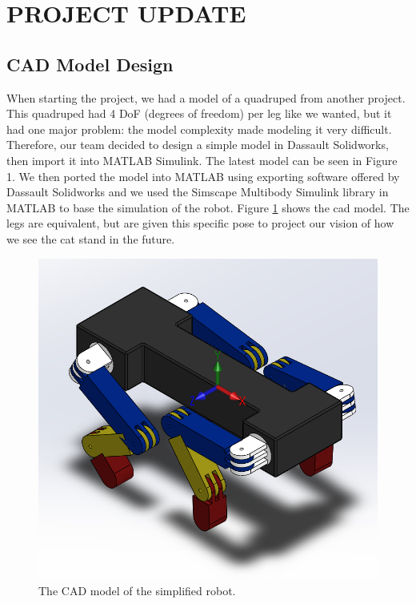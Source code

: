 \section{PROJECT UPDATE}
\subsection{CAD Model Design} \label{sec:CAD Model Design}
When starting the project, we had a model of a quadruped from another project. This quadruped had 4 DoF (degrees of freedom) per leg like we wanted, but it had one major problem: the model complexity made modeling it very difficult. Therefore, our team decided to design a simple model in Dassault Solidworks, then import it into MATLAB Simulink. The latest model can be seen in Figure 1.
We then ported the model into MATLAB using exporting software offered by  Dassault Solidworks and we used the Simscape Multibody Simulink library in MATLAB to base the simulation of the robot.
Figure \ref{fig:cadmodel} shows the cad model. The legs are equivalent, but are given this specific pose to project our vision of how we see the cat stand in the future.
\begin{figure}[thpb]
    \parbox{\linewidth}{\includegraphics[width=\linewidth]{Figures/robot.png}}
    \caption{The CAD model of the simplified robot.}
    \label{fig:cadmodel}
\end{figure}


